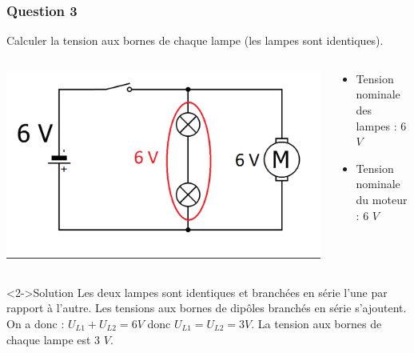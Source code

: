 \documentclass[xcolor={dvipsnames}]{beamer}
\begin{document}
\begin{frame}
\frametitle{Question 3}
\begin{block}{}
	Calculer la tension aux bornes de chaque lampe (les lampes sont identiques).
\end{block}


\begin{columns}
	\begin{column}{0.4\textwidth}
		\includegraphics[scale=0.2]{../3_schema}
		
	\end{column}
	
	\begin{column}{0.6\textwidth}
		\begin{itemize}
			\item Tension nominale des lampes : 6 $V$
			\item Tension nominale du moteur : 6 $V$
		\end{itemize}		
		
	\end{column}
\end{columns}

\begin{block}<2->{Solution}
	Les deux lampes sont identiques et branchées en série l'une par rapport à l'autre. Les tensions aux bornes de dipôles branchés en série s'ajoutent. On a donc : $U_{L1} + U_{L2} = 6 V$ donc $U_{L1} = U_{L2} = 3 V$. La tension aux bornes de chaque lampe est 3 $V$.
\end{block}


\end{frame}
\end{document}
